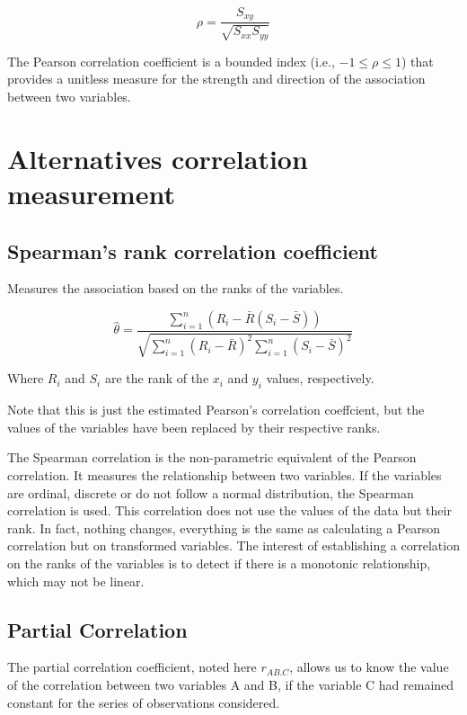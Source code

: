 \documentclass[
]{report}
\begin{document}
\[\rho=\frac{S_{xy}}{\sqrt{S_{xx}S_{yy}}}\]

The Pearson correlation coefficient is a bounded index (i.e., \(-1 \leq \rho \leq 1\)) that provides a unitless measure for the strength and direction of the association between two variables.

\hypertarget{alternatives-correlation-measurement}{%
\section{Alternatives correlation measurement}\label{alternatives-correlation-measurement}}

\hypertarget{spearmans-rank-correlation-coefficient}{%
\subsection{Spearman's rank correlation coefficient}\label{spearmans-rank-correlation-coefficient}}

Measures the association based on the ranks of the variables.

\[\hat{\theta}=\frac{\sum_{i=1}^n(R_i-\bar{R}(S_i-\bar{S}))}{\sqrt{\sum_{i=1}^n(R_i-\bar{R})^2\sum_{i=1}^n(S_i-\bar{S})^2}}\]

Where \(R_i\) and \(S_i\) are the rank of the \(x_i\) and \(y_i\) values, respectively.

Note that this is just the estimated Pearson's correlation coeffcient, but the values of the variables have been replaced by their respective ranks.

The Spearman correlation is the non-parametric equivalent of the Pearson correlation. It measures the relationship between two variables. If the variables are ordinal, discrete or do not follow a normal distribution, the Spearman correlation is used. This correlation does not use the values of the data but their rank.
In fact, nothing changes, everything is the same as calculating a Pearson correlation but on transformed variables.
The interest of establishing a correlation on the ranks of the variables is to detect if there is a monotonic relationship, which may not be linear.

\hypertarget{partial-correlation}{%
\subsection{Partial Correlation}\label{partial-correlation}}

The partial correlation coefficient, noted here \(r_{AB.C}\), allows us to know the value of the correlation between two variables A and B, if the variable C had remained constant for the series of observations considered.
\end{document}
